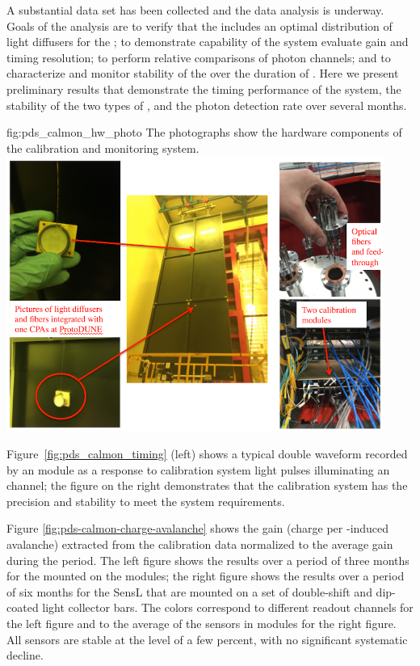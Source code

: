 A substantial  data set has been collected and the data analysis is underway. 
Goals of the analysis are to verify that the  includes an optimal distribution of light diffusers for the ;
to demonstrate capability of the system evaluate gain and timing resolution; to perform relative comparisons of photon channels;
and to characterize and monitor stability of the  over the duration of . Here we present preliminary results that demonstrate the timing performance of the system, the stability of the two types of , and the photon detection rate over several months.


\begin{dunefigure}
 {fig:pds_calmon_hw_photo}
 {The photographs show the hardware components of the  calibration and monitoring system.}
 \includegraphics[angle=0, height=9cm]{graphics/pds-calmon-fig2.png}
\end{dunefigure}


Figure~\ref{fig:pds_calmon_timing} (left) shows a typical double waveform recorded by an   module as a response to calibration system
light pulses illuminating an  channel; the figure on the right demonstrates that the calibration system has the precision and stability to meet the system requirements.

Figure \ref{fig:pds-calmon-charge-avalanche} shows the  gain (charge per \phel-induced avalanche) extracted from the calibration data normalized to the average gain during the period. The left figure shows the results over a period of three months for the  mounted on the  modules; the right figure shows the results over a period of six months for the SensL  that are mounted on a set of double-shift and dip-coated light collector bars. The colors correspond to different readout channels for the left figure and to the average of the sensors in  modules for the right figure.
All sensors are stable at the level of a few percent, with no significant systematic decline.

